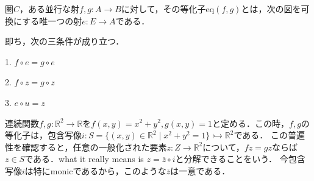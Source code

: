 \documentclass[uplatex, dvipdfmx]{jsarticle}
\begin{document}
\begin{definition}
    圏$C$，ある並行な射$f,g:A\to B$に対して，その等化子$\mathrm{eq}(f,g)$とは，次の図を可換にする唯一つの射$e:E\to A$である．
    \begin{center}\end{center}
    即ち，次の三条件が成り立つ．

    1. $f\circ e=g\circ e$

    2. $f\circ z=g\circ z$

    3. $e\circ u=z$
\end{definition}

\begin{example}[Top]
    連続関数$f,g:\mathbb{R}^2\to\mathbb{R}$を$f(x,y)=x^2+y^2, g(x,y)=1$と定める．この時，$f,g$の等化子は，包含写像$i:S=\{(x,y)\in\mathbb{R}^2\mid x^2+y^2=1\}\rightarrowtail\mathbb{R}^2$である．
    この普遍性を確認すると，任意の一般化された要素$z:Z\to\mathbb{R}^2$について，$fz=gz$ならば$z\in S$である．what it really means is $z=\overline{z}\circ i$と分解できることをいう．
    今包含写像$i$は特にmonicであるから，このような$\overline{z}$は一意である．
    \begin{center}\end{center}
\end{example}
\end{document}

